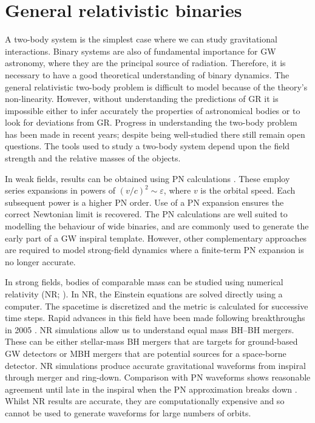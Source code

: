 \section{General relativistic binaries}\label{sec:two-body}

A two-body system is the simplest case where we can study gravitational interactions. Binary systems are also of fundamental importance for GW astronomy, where they are the principal source of radiation. Therefore, it is necessary to have a good theoretical understanding of binary dynamics. The general relativistic two-body problem is difficult to model because of the theory's non-linearity. However, without understanding the predictions of GR it is impossible either to infer accurately the properties of astronomical bodies or to look for deviations from GR. Progress in understanding the two-body problem has been made in recent years; despite being well-studied there still remain open questions. The tools used to study a two-body system depend upon the field strength and the relative masses of the objects.

In weak fields, results can be obtained using PN calculations \citep{Blanchet2006}. These employ series expansions in powers of  $(v/c)^2 \sim \varepsilon$, where $v$ is the orbital speed. Each subsequent power is a higher PN order. Use of a PN expansion ensures the correct Newtonian limit is recovered. The PN calculations are well suited to modelling the behaviour of wide binaries, and are commonly used to generate the early part of a GW inspiral template. However, other complementary approaches are required to model strong-field dynamics where a finite-term PN expansion is no longer accurate.

In strong fields, bodies of comparable mass can be studied using numerical relativity (NR; \citealt{Centrella2010,Pfeiffer2012,Sperhake2013}). In NR, the Einstein equations are solved directly using a computer. The spacetime is discretized and the metric is calculated for successive time steps. Rapid advances in this field have been made following breakthroughs in 2005 \citep{Pretorius2005,Campanelli2006,Baker2006}. NR simulations allow us to understand equal mass BH--BH mergers. These can be either stellar-mass BH mergers that are targets for ground-based GW detectors or MBH mergers that are potential sources for a space-borne detector. NR simulations produce accurate gravitational waveforms from inspiral through merger and ring-down. Comparison with PN waveforms shows reasonable agreement until late in the inspiral when the PN approximation breaks down \citep[e.g.,][]{Baker2007,Buonanno2007}. Whilst NR results are accurate, they are computationally expensive and so cannot be used to generate waveforms for large numbers of orbits.

